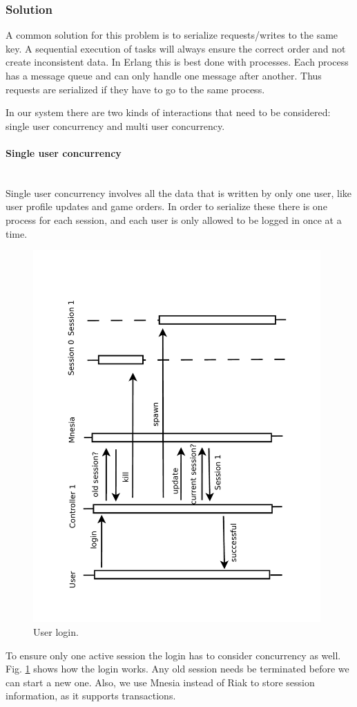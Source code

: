 \documentclass[11pt,a4paper]{report}
\newcommand{\subsubsubsection}[1]{\paragraph{#1}\mbox{}\\}
\begin{document}
\subsubsection{Solution}
A common solution for this problem is to serialize requests/writes to the same
key.
A sequential execution of tasks will always ensure the correct order and not
create inconsistent data.
In Erlang this is best done with processes.
Each process has a message queue and can only handle one message after another.
Thus requests are serialized if they have to go to the same process.

In our system there are two kinds of interactions that need to be considered:
single user concurrency and multi user concurrency.

\subsubsubsection{Single user concurrency}
Single user concurrency involves all the data that is written by only one user,
like user profile updates and game orders.
In order to serialize these there is one process for each session,
and each user is only allowed to be logged in once at a time.
\begin{figure}[htbp!]
  \centering
 \includegraphics[width=11cm, angle=-90]{./graphics/Concurrency_-_Login.pdf}
 \vspace{-1cm}
 \caption{User login.}
 \label{fig:concurrency:login}
\end{figure}
To ensure only one active session the login has to consider concurrency as well.
Fig. \ref{fig:concurrency:login} shows how the login works.
Any old session needs be terminated before we can start a new one.
Also, we use Mnesia instead of Riak to store session information,
as it supports transactions.
\end{document}
